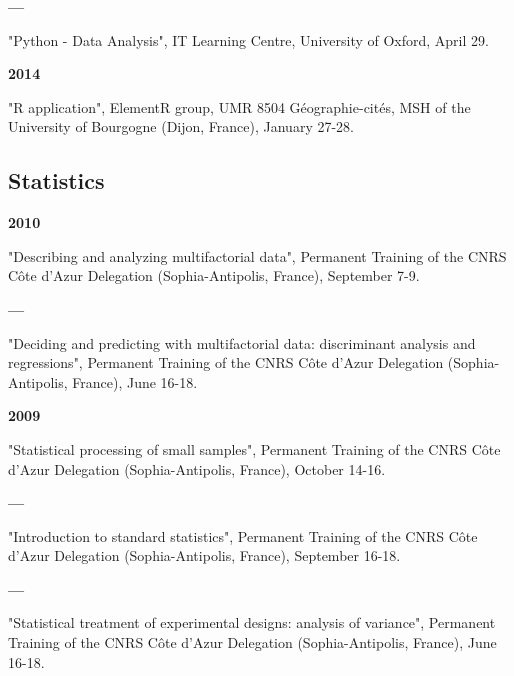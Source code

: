 \documentclass{article}
\newcommand{\fr}[1]{} %
\newcommand{\en}[1]{#1}   %
\begin{document}
\smallbreak
\textbf{--- }
\fr{"\textsf{Python} - Data Analysis", IT Learning Centre, University of Oxford, 29 Avril.}
\en{"\textsf{Python} - Data Analysis", IT Learning Centre, University of Oxford, April 29.}

\smallbreak
\textbf{2014 }
\fr{"\textsf{R} application", groupe \textit{ElementR}, UMR 8504 G\'{e}ographie-cit\'{e}s, MSH de l'Universit\'{e} de Bourgogne (Dijon, France) 27-28 Janvier.}
\en{"\textsf{R} application", ElementR group, UMR 8504 Géographie-cités, MSH of the University of Bourgogne (Dijon, France), January 27-28.}

\smallbreak

\subsection*{\fr{Statistiques}\en{Statistics}}

\textbf{2010 }
\fr{"Décrire et analyser des données multifactorielles", Formation permanente de la Délégation CNRS Côte d'Azur (Sophia-Antipolis, France), 7-9 septembre.}
\en{"Describing and analyzing multifactorial data", Permanent Training of the CNRS Côte d'Azur Delegation (Sophia-Antipolis, France), September 7-9.}

\smallbreak
\textbf{--- }
\fr{"Décider et prédire avec des données multifactorielles : analyse discriminante et régressions", Formation permanente de la Délégation CNRS Côte d'Azur (Sophia-Antipolis, France), 16-18 juin.}
\en{"Deciding and predicting with multifactorial data: discriminant analysis and regressions", Permanent Training of the CNRS Côte d'Azur Delegation (Sophia-Antipolis, France), June 16-18.}

\smallbreak
\textbf{2009 }
\fr{"Traitement statistique des petits échantillons", Formation permanente de la Délégation CNRS Côte d'Azur (Sophia-Antipolis, France), 14-16 octobre.}
\en{"Statistical processing of small samples", Permanent Training of the CNRS Côte d'Azur Delegation (Sophia-Antipolis, France), October 14-16.}

\smallbreak
\textbf{--- }
\fr{"Introduction aux statistiques standards", Formation permanente de la Délégation CNRS Côte d'Azur (Sophia-Antipolis, France), 16-18 septembre.}
\en{"Introduction to standard statistics", Permanent Training of the CNRS Côte d'Azur Delegation (Sophia-Antipolis, France), September 16-18.}

\smallbreak
\textbf{--- }
\fr{"Traitement statistique des plans d'expériences : analyse de la variance", Formation permanente de la Délégation CNRS Côte d'Azur (Sophia-Antipolis, France), 16-18 juin.}
\en{"Statistical treatment of experimental designs: analysis of variance", Permanent Training of the CNRS Côte d'Azur Delegation (Sophia-Antipolis, France), June 16-18.}
\end{document}
